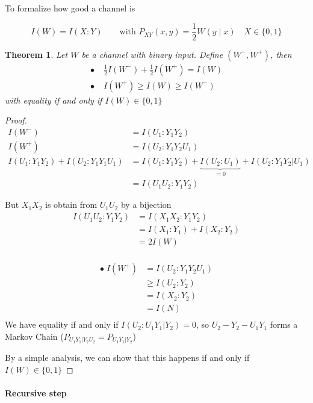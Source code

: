 \documentclass{article}
\newtheorem{thm}{Theorem}
\begin{document}
To formalize how good a channel is

\[I(W)=I(X:Y) \qquad \text{with } P_{XY}(x,y)=\frac{1}{2}W(y\;|\;x)\quad X\in\{0,1\}\]



\begin{thm}
Let $W$ be a channel with binary input. Define $(W^-,W^+)$, then
\begin{align*}
\bullet &\; \frac{1}{2}I(W^-)+\frac{1}{2}I(W^+)=I(W)\\
\bullet &\; I(W^+)\geq I(W)\geq I(W^-)
\end{align*}
with equality if and only if $I(W)\in\{0,1\}$
\end{thm}

\begin{proof}
\begin{align*}
I(W^-) & = I (U_1 : Y_1Y_2)\\
I(W^+) & = I(U_2 : Y_1Y_2U_1)\\
I(U_1:Y_1Y_2)+I(U_2:Y_1Y_1U_1) & = I(U_1:Y_1Y_2) + \underbrace{I(U_2:U_1)}_{=0} + I(U_2:Y_1Y_2|U_1)\\
& = I(U_1U_2:Y_1Y_2)
\end{align*}

But $X_1X_2$ is obtain from $U_1U_2$ by a bijection
\begin{align*}
I(U_1U_2:Y_1Y_2)& = I(X_1X_2:Y_1Y_2)\\
& = I(X_1:Y_1)+I(X_2:Y_2) \tag{As $X_1$ and $X_2$ are independent}\\
& = 2I(W)\\
\end{align*}

\begin{align*}
\bullet \; I(W^+) &= I(U_2:Y_1Y_2U_1)\\
&\geq I(U_2:Y_2)\\
&=I(X_2:Y_2)\\
&=I(N)\\
\end{align*}
We have equality if and only if $I(U_2:U_1Y_1|Y_2)=0$, so $U_2-Y_2-U_1Y_1$ forms a Markov Chain ($P_{U_1Y_1|Y_2U_2}=P_{U_1Y_1|Y_2}$)

By a simple analysis, we can show that this happens if and only if $I(W)\in \{0,1\}$
\end{proof}



\paragraph{Recursive step}
\end{document}
